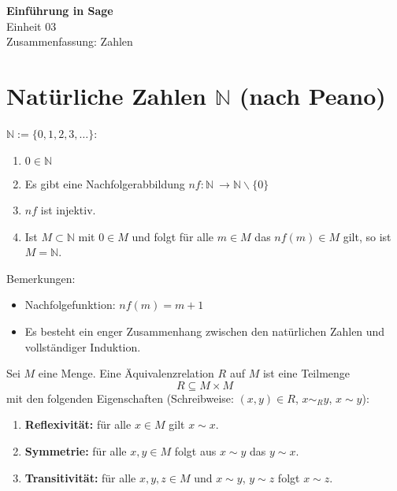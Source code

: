 \documentclass[a4paper,12pt,DIV15]{scrartcl}
\begin{document}
\begin{center}
    \textbf{\LARGE Einführung in Sage}\\
    {\large Einheit 03}\\
    {\large Zusammenfassung: Zahlen}
\end{center}

\section{Natürliche Zahlen $\mathbb{N}$ (nach Peano)}
$\mathbb{N} := \{0,1,2,3,\dots\}$:
\begin{enumerate}
\item $0 \in \mathbb{N}$
\item Es gibt eine Nachfolgerabbildung $nf : \mathbb{N} \
  \rightarrow \mathbb{N} \smallsetminus \{ 0 \}$
\item $nf$ ist injektiv.
\item Ist $M \subset \mathbb{N}$ mit $0 \in M$ und folgt für alle  $m \in M$ das
  $nf(m) \in M$ gilt, so ist $M=\mathbb{N}$.
\end{enumerate}
Bemerkungen:
\begin{itemize}
\item Nachfolgefunktion: $nf(m)=m+1$
\item Es besteht ein enger Zusammenhang zwischen den natürlichen
  Zahlen und vollständiger  Induktion.
\end{itemize}

\begin{defn}[Äquivalenzrelation]
Sei $M$ eine Menge. Eine {\color{red} Äquivalenzrelation} $R$ auf $M$ ist eine Teilmenge
\[R\subseteq M \times M\]
 mit den folgenden Eigenschaften (Schreibweise: $(x,y) \in R$, $x \sim_R y$, $x \sim y$):
\begin{enumerate}
\item \textbf{Reflexivität:} für alle $x \in M$ gilt $x \sim x$. 
\item \textbf{Symmetrie:} für alle $x,y \in M$ folgt aus $x \sim y$ das $y \sim x$.
\item \textbf{Transitivität:} für alle $x,y,z \in M$ und $x \sim y$, $y \sim z$ folgt
  $x \sim z$.  
\end{enumerate}
\end{defn}
\end{document}
